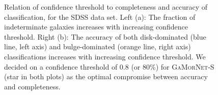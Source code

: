 \documentclass[twocolumn]{aastex63}
\newcommand\gamornet{G\textsc{a}M\textsc{or}N\textsc{et}}
\begin{document}
\begin{figure}[htb]
	\begin{center}
  \end{center}
  \caption{Relation of confidence threshold to completeness and accuracy of classification, for the SDSS data set. Left (a): The fraction of indeterminate galaxies increases with increasing confidence threshold.  Right (b): The accuracy of both disk-dominated (blue line, left axis) and bulge-dominated (orange line, right axis) classifications increases with increasing confidence threshold. We decided on a confidence threshold of 0.8 (or 80\%) for \gamornet{}-S (star in both plots) as the optimal compromise between accuracy and completeness.}
  \label{fig:sdss_threshold}
\end{figure}
\end{document}
